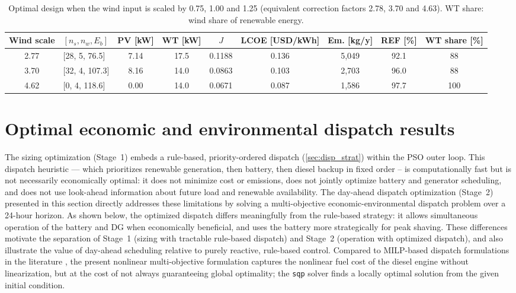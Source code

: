 \documentclass[final,3p,times]{elsarticle}
\begin{document}
\begin{table}[htbp]
\centering
\small
\begin{tabular}{c l c c c c c c c}
\toprule
\textbf{Wind scale} & \textbf{$[n_s, n_w, E_b]$} & \textbf{PV [kW]} & \textbf{WT [kW]} & \textbf{$J$} & \textbf{LCOE [USD/kWh]} & \textbf{Em. [kg/y]} & \textbf{REF [\%]} & \textbf{WT share [\%]} \\
\midrule
2.77 & [28, 5, 76.5] & 7.14 & 17.5 & 0.1188 & 0.136 & 5,049 & 92.1 & 88 \\
3.70 & [32, 4, 107.3] & 8.16 & 14.0 & 0.0863 & 0.103 & 2,703 & 96.0 & 88 \\
4.62 & [0, 4, 118.6] & 0.00 & 14.0 & 0.0671 & 0.087 & 1,586 & 97.7 & 100 \\
\bottomrule
\end{tabular}
\caption{\label{tab:wind_sweep} Optimal design when the wind input is scaled by 0.75, 1.00 and 1.25 (equivalent correction factors 2.78, 3.70 and 4.63). WT share: wind share of renewable energy.}
\end{table}

\section{\label{sec:dispatch_opt} Optimal economic and environmental dispatch results}

The sizing optimization (Stage~1) embeds a rule-based, priority-ordered dispatch (\cref{sec:disp_strat}) within the PSO outer loop. This dispatch heuristic --- which prioritizes renewable generation, then battery, then diesel backup in fixed order -- is computationally fast but is not necessarily economically optimal: it does not minimize cost or emissions, does not jointly optimize battery and generator scheduling, and does not use look-ahead information about future load and renewable availability. The day-ahead dispatch optimization (Stage~2) presented in this section directly addresses these limitations by solving a multi-objective economic-environmental dispatch problem over a 24-hour horizon. As shown below, the optimized dispatch differs meaningfully from the rule-based strategy: it allows simultaneous operation of the battery and DG when economically beneficial, and uses the battery more strategically for peak shaving. These differences motivate the separation of Stage~1 (sizing with tractable rule-based dispatch) and Stage~2 (operation with optimized dispatch), and also illustrate the value of day-ahead scheduling relative to purely reactive, rule-based control. Compared to MILP-based dispatch formulations in the literature \cite{parisio2014, dercam}, the present nonlinear multi-objective formulation captures the nonlinear fuel cost of the diesel engine without linearization, but at the cost of not always guaranteeing global optimality; the \texttt{sqp} solver finds a locally optimal solution from the given initial condition.
\end{document}
